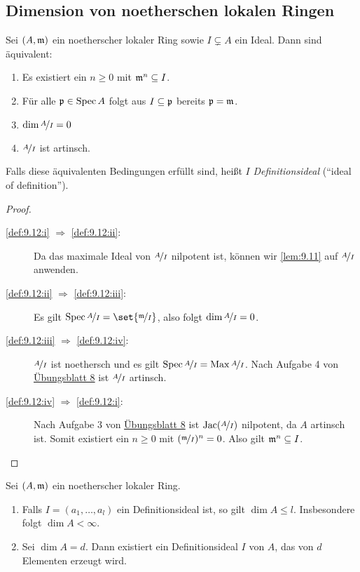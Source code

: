 \documentclass[12pt,a4paper]{scrartcl}
\theoremstyle{cplain}
\theoremstyle{cdef}
\begin{document}
\subsection{Dimension von noetherschen lokalen Ringen}
\begin{defi}
	Sei $(A, \mathfrak{m})$ ein noetherscher lokaler Ring sowie $I\subsetneq A$ ein Ideal. Dann sind äquivalent:
	\begin{enumerate}
		\item Es existiert ein $n\ge 0$ mit $\mathfrak{m}^n\subseteq I$. \label{def:9.12:i}
		\item Für alle $\mathfrak{p} \in \operatorname{Spec} A$ folgt aus $I\subseteq \mathfrak{p}$ bereits $\mathfrak{p} = \mathfrak{m}$. \label{def:9.12:ii}
		\item $\dim \nicefrac{A}{I} = 0$ \label{def:9.12:iii}
		\item $\nicefrac{A}{I}$ ist artinsch. \label{def:9.12:iv}
	\end{enumerate}
	Falls diese äquivalenten Bedingungen erfüllt sind, heißt $I$ \emph{Definitionsideal} (\enquote{ideal of definition}).
\end{defi}
\begin{proof}
	\leavevmode
	\begin{description}
		\item[\ref{def:9.12:i} $\Rightarrow$ \ref{def:9.12:ii}:] Da das maximale Ideal von $\nicefrac{A}{I}$ nilpotent ist, können wir \cref{lem:9.11} auf $\nicefrac{A}{I}$ anwenden.
		\item[\ref{def:9.12:ii} $\Rightarrow$ \ref{def:9.12:iii}:] Es gilt $\Spec \fak AI = \set{\fak \fm I}$, also folgt $\dim \nicefrac{A}{I} = 0$.
		\item[\ref{def:9.12:iii} $\Rightarrow$ \ref{def:9.12:iv}:] $\nicefrac{A}{I}$ ist noethersch und es gilt $\operatorname{Spec} \nicefrac{A}{I} = \operatorname{Max} \nicefrac{A}{I}$. Nach Aufgabe 4 von \href{http://www.math.uni-bonn.de/ag/stroppel/Franzen_Algebra_1_Uebung/Blatt8.pdf}{Übungsblatt 8} ist $\nicefrac{A}{I}$ artinsch.
		\item[\ref{def:9.12:iv} $\Rightarrow$ \ref{def:9.12:i}:] Nach Aufgabe 3 von \href{http://www.math.uni-bonn.de/ag/stroppel/Franzen_Algebra_1_Uebung/Blatt8.pdf}{Übungsblatt 8} ist $\operatorname{Jac}(\nicefrac{A}{I})$ nilpotent, da $A$ artinsch ist. Somit existiert ein $n\ge0$ mit $(\nicefrac{\mathfrak{m}}{I})^n = 0$. Also gilt $\mathfrak{m}^n \subseteq I$.
		\qedhere
	\end{description}
\end{proof}
\begin{satz}
	Sei $(A, \mathfrak{m})$ ein noetherscher lokaler Ring.
	\begin{enumerate}
		\item Falls $I = (a_1,\dots, a_l)$ ein Definitionsideal ist, so gilt $\dim A \le l$. Insbesondere folgt $\dim A <\infty$. \label{thm:9.13:i}
		\item Sei $\dim A = d$. Dann existiert ein Definitionsideal $I$ von $A$, das von $d$ Elementen erzeugt wird. \label{thm:9.13:ii}
	\end{enumerate}
\end{satz}
\end{document}
